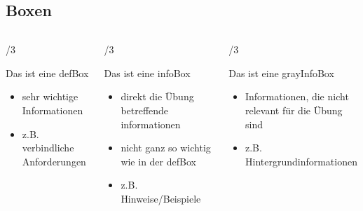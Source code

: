 \documentclass[
    ngerman,
    accentcolor=3b,
    dark_mode,
    fontsize= 12pt,
    a4paper,
    aspectratio=169,
    colorback=true,
    fancy_row_colors,
    leqno,
    fleqn,
    boxarc=3pt,
    fleqn,
    design=2008,
]{algoslides}
\begin{document}
    \subsection{Boxen}
    \begin{frame}
        \slidehead{}
        \begin{columns}[c]
            \begin{column}[t]{\textwidth/3}
                \begin{defBox}
                    Das ist eine defBox
                \end{defBox}
                \begin{itemize}
                    \item sehr wichtige Informationen
                    \item z.B. verbindliche Anforderungen
                \end{itemize}
            \end{column}%
            \begin{column}[t]{\textwidth/3}
                \begin{infoBox}
                    Das ist eine infoBox
                \end{infoBox}
                \begin{itemize}
                    \item direkt die Übung betreffende informationen
                    \item nicht ganz so wichtig wie in der defBox
                    \item z.B. Hinweise/Beispiele
                \end{itemize}
            \end{column}%
            \begin{column}[t]{\textwidth/3}
                \begin{grayInfoBox}
                    Das ist eine grayInfoBox
                \end{grayInfoBox}
                \begin{itemize}
                    \item Informationen, die nicht relevant für die Übung sind
                    \item z.B. Hintergrundinformationen
                \end{itemize}
            \end{column}%
        \end{columns}
    \end{frame}
\end{document}
